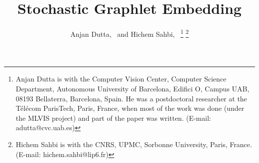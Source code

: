 \documentclass[journal]{IEEEtran}
\theoremstyle{definition}
\begin{document}
%
\title{Stochastic Graphlet Embedding}
%
%
%
%

\author{Anjan Dutta,~ and Hichem Sahbi,~%
\thanks{Anjan Dutta is with the Computer Vision Center, Computer Science Department, Autonomous University of Barcelona, Edifici O, Campus UAB, 08193 Bellaterra, Barcelona, Spain. He was a postdoctoral researcher at the T\'{e}l\'{e}com ParisTech, Paris, France, when most of the work was done (under the MLVIS project) and part of the paper was written. (E-mail: adutta@cvc.uab.es)}
\thanks{Hichem Sahbi is with the CNRS, UPMC, Sorbonne University, Paris, France. (E-mail: hichem.sahbi@lip6.fr)}}

\end{document}
